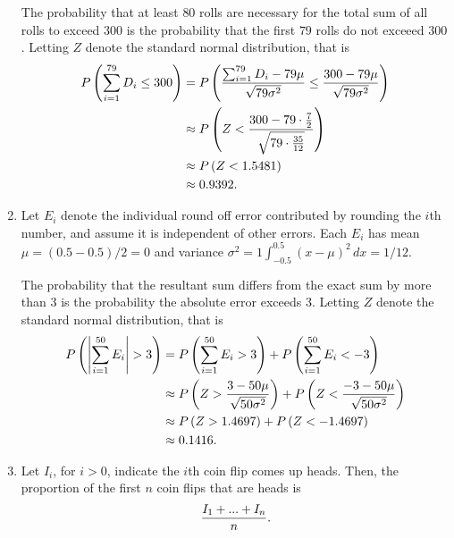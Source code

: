 \documentclass{article}
\begin{document}
\begin{enumerate}
    The probability that at least $80$ rolls are necessary for the total sum of all rolls
    to exceed $300$ is the probability that the first $79$ rolls do not exceeed $300$.
    Letting $Z$ denote the standard normal distribution, that is
    \[\begin{split}
    P\left( \sum_{i=1}^{79} D_i \leq 300 \right)    & = P\left( \frac{\sum_{i=1}^{79} D_i - 79\mu}{\sqrt{79\sigma^2}} \leq \frac{300-79\mu}{\sqrt{79\sigma^2}} \right) \\
                                                    & \approx P\left( Z < \frac{300-79\cdot\frac{7}{2}}{\sqrt{79\cdot\frac{35}{12}}}\right) \\
                                                    & \approx P\left( Z < 1.5481 \right) \\
                                                    & \approx 0.9392\text. \\
    \end{split}\]
\item
    Let $E_i$ denote the individual round off error contributed by rounding the $i$th number, and assume it is independent of other errors.
    Each $E_i$ has mean $\mu=(0.5-0.5)/2=0$ and variance $\sigma^2=1\int_{-0.5}^{0.5}(x-\mu)^2\,dx=1/12$.

    The probability that the resultant sum differs from the exact sum by more than $3$ is the probability the absolute error exceeds $3$.
    Letting $Z$ denote the standard normal distribution, that is
    \[\begin{split}
    P\left( \left|\sum_{i=1}^{50} E_i\right|>3 \right)  & = P\left( \sum_{i=1}^{50} E_i > 3 \right) + P\left( \sum_{i=1}^{50} E_i < -3 \right) \\
                                                        & \approx P\left( Z > \frac{3-50\mu}{\sqrt{50\sigma^2}} \right) + P\left( Z < \frac{-3-50\mu}{\sqrt{50\sigma^2}} \right) \\
                                                        & \approx P\left( Z > 1.4697 \right) + P\left( Z < -1.4697 \right) \\
                                                        & \approx 0.1416\text. \\
    \end{split}\]
\item
    Let $I_i$, for $i>0$, indicate the $i$th coin flip comes up heads. Then, the proportion of the first $n$ coin flips that are heads is \[\frac{I_1+...+I_n}{n}\text.\]


\end{enumerate}
\end{document}
